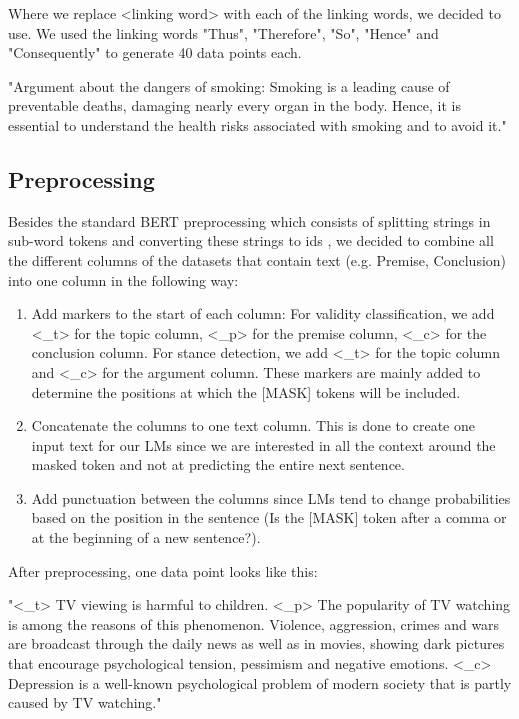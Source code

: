 Where we replace <linking word> with each of the linking words, we decided to use. We used the linking words "Thus", "Therefore", "So", "Hence" and "Consequently" to generate 40 data points each.
\begin{center}
	"Argument about the dangers of smoking: Smoking is a leading cause of preventable deaths, damaging nearly every organ in the body. Hence, it is essential to understand the health risks associated with smoking and to avoid it."
\end{center}

\subsection{Preprocessing}

Besides the standard BERT preprocessing which consists of splitting strings in sub-word tokens and converting these strings to ids \cite{bertprepro}, we decided to combine all the different columns of the datasets that contain text (e.g. Premise, Conclusion) into one column in the following way:
\begin{enumerate}
	\item Add markers to the start of each column: For validity classification, we add <\_t> for the topic column, <\_p> for the premise column, <\_c> for the conclusion column. For stance detection, we add <\_t> for the topic column and <\_c> for the argument column. These markers are mainly added to determine the positions at which the [MASK] tokens will be included.
	\item Concatenate the columns to one text column. This is done to create one input text for our LMs since we are interested in all the context around the masked token and not at predicting the entire next sentence.
	\item Add punctuation between the columns since LMs tend to change probabilities based on the position in the sentence (Is the [MASK] token after a comma or at the beginning of a new sentence?).
\end{enumerate}

After preprocessing, one data point looks like this:
\begin{center}
\raggedright
"<\_t> TV viewing is harmful to children. <\_p> The popularity of TV watching is among the reasons of this phenomenon. Violence, aggression, crimes and wars are broadcast through the daily news as well as in movies, showing dark pictures that encourage psychological tension, pessimism and negative emotions. <\_c> Depression is a well-known psychological problem of modern society that is partly caused by TV watching."
\end{center}